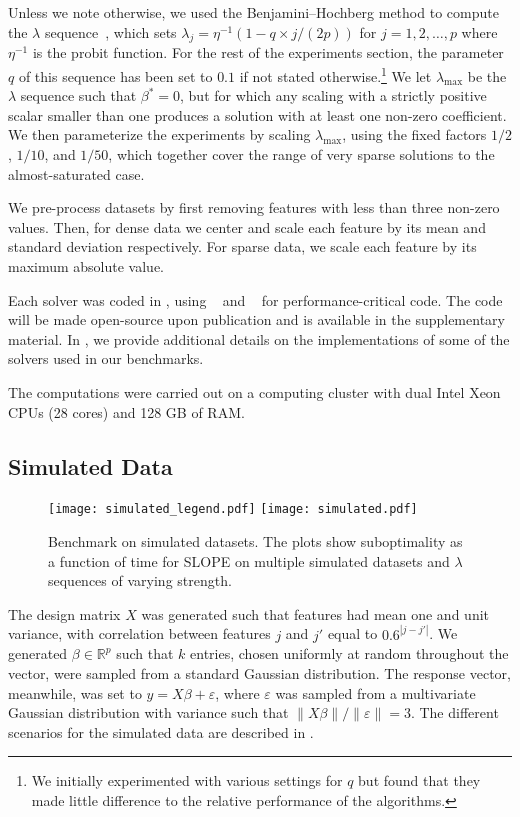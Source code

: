 Unless we note otherwise, we used the Benjamini--Hochberg method to compute the \(\lambda\) sequence~\parencite{bogdan2015},
which sets $\lambda_j = \eta^{-1}(1 - q\times j / (2p))$ for $j=1, 2, \hdots, p$ where $\eta^{-1}$ is the probit function.
For the rest of the experiments section, the parameter $q$ of this sequence has been set to $0.1$ if not stated otherwise.\footnote{We initially experimented with various settings for \(q\) but found that they made little difference to the relative performance of the algorithms.}
We let \(\lambda_\text{max}\) be the \(\lambda\) sequence such that \(\beta^* = 0\), but for which any scaling with a strictly positive scalar smaller than one produces a solution with at least one non-zero coefficient.
We then parameterize the experiments by scaling \(\lambda_\text{max}\), using the fixed factors \(1/2\), \(1/10\), and \(1/50\), which together cover the range of very sparse solutions to the almost-saturated case.

We pre-process datasets by first removing features with less than three non-zero values. Then, for dense data we center and scale each feature by its mean and standard deviation respectively.
For sparse data, we scale each feature by its maximum absolute value.

Each solver was coded in , using ~\parencite{harris2020} and ~\parencite{lam2015} for performance-critical code.
The code will be made open-source upon publication and is available in the supplementary material.
In , we provide additional details on the implementations of some of the solvers used in our benchmarks.

The computations were carried out on a computing cluster with dual Intel Xeon CPUs (28 cores) and 128 GB of RAM.

\subsection{Simulated Data}
\label{sec:experiments-real-data}

\begin{figure*}[!t]
  \centering
  \texttt{[image: simulated\_legend.pdf]}
  \texttt{[image: simulated.pdf]} \caption{Benchmark on simulated datasets. The plots show suboptimality as a function of time for SLOPE on multiple simulated datasets and $\lambda$ sequences of varying strength.}
  \label{fig:simulated}
\end{figure*}

The design matrix $X$ was generated such that features had mean one and unit variance, with correlation between features $j$ and $j'$ equal to $0.6^{|j-j'|}$.
We generated \(\beta \in \mathbb{R}^p\) such that \(k\) entries, chosen uniformly at random throughout the vector, were sampled from a standard Gaussian distribution.
The response vector, meanwhile, was set to $y=X\beta + \varepsilon$, where
$\varepsilon$ was sampled from a multivariate Gaussian distribution with variance such that $\lVert X\beta\rVert / \lVert \varepsilon \rVert = 3$.
The different scenarios for the simulated data are described in .

